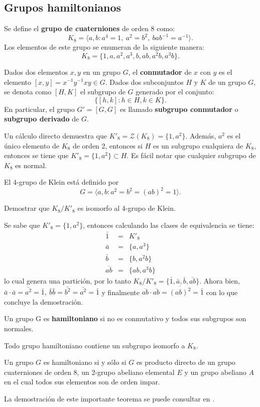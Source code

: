 \subsection{Grupos hamiltonianos}
Se define el \textbf{grupo de cuaterniones} de orden 8 como:\[ K_8 =  \langle a,b \colon a^4 =1, \ a^2 = b ^2, \ bab^{-1} = a^{-1} \rangle.  \]
Los elementos de este grupo se enumeran de la siguiente manera:
\[ K_8 = \{ 1,a,a^2, a^3, b, ab, a^2b, a^3b \}. \]
\begin{definicion}
Dados dos elementos $x,y$ en un grupo $G$, el \textbf{conmutador} de $x$ con $y$ es el elemento $[x,y] = x^{-1}y^{-1}xy \in G$. Dados dos subconjuntos $H$ y $K$ de un grupo $G$, se denota como $[H,K]$ el subgrupo de $G$ generado por el conjunto:
\[\{[h,k] \colon h \in H, k \in K\}. \]
En particular, el grupo $G'=[G,G]$ es llamado \textbf{subgrupo conmutador} o \textbf{subgrupo derivado} de $G$.
\end{definicion}
Un cálculo directo demuestra que $K'_8 = \mathcal{Z}(K_8) = \{1, a^2\}$. Además, $a^2$ es el único elemento de $K_8$ de orden 2, entonces si $H$ es un subgrupo cualquiera de $K_8$, entonces se tiene que $K'_8 = \{1,a^2\} \subset H$. Es fácil notar que cualquier subgrupo de $K_8$ es normal.
\begin{definicion}
El 4-grupo de Klein está definido por
\[ G = \langle a, b \colon a^2 = b^2 = (ab)^2 = 1 \rangle. \] 
\end{definicion}
\begin{ejercicio}\label{ejer:klein}
Demostrar que $K_8/K'_8$ es isomorfo al 4-grupo de Klein.
\end{ejercicio} 
\begin{solucion}
Se sabe que $K'_8 = \{1,a^2\}$, entonces calculando las clases de equivalencia se tiene:
\begin{eqnarray*}
\bar{1} &=& K'_8\\
\bar{a} &=& \{a, a^3\} \\
\bar{b} &=&  \{b, a^2b \} \\
\overline{ab} &=& \{ ab, a^3b \}
\end{eqnarray*}
lo cual genera una partición, por lo tanto $K_8/K'_8 = \{\bar{1},\bar{a},\bar{b}, \bar{ab}  \}$. Ahora bien, $\bar{a}\cdot\bar{a} =\bar{a^2}=\bar{1}, \ \bar{b}\bar{b} = \bar{b^2} = \bar{a^2} = \bar{1}$ y finalmente $\overline{ab}\cdot\overline{ab} = \overline{(ab)^2} = \bar{1}$ con lo que concluye la demostración. \qedsymbol
\end{solucion}
\begin{definicion}
Un grupo G es  \textbf{hamiltoniano} si no es conmutativo y todos sus subgrupos son normales. 
\end{definicion}
\begin{lema}
Todo grupo hamiltoniano contiene un subgrupo isomorfo a $K_8$.
\end{lema}
\begin{teorema}
Un grupo $G$ es hamiltoniano si y sólo si $G$ es producto directo de un grupo cuaterniones de orden 8, un 2-grupo abeliano elemental $E$ y un grupo abeliano $A$ en el cual todos sus elementos son de orden impar.
\end{teorema}
La demostración de este importante teorema se puede consultar en \cite[p.130]{bib:groupBook}.
